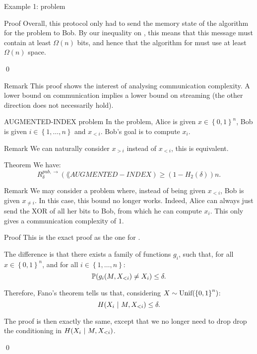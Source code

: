 \documentclass[a4paper]{article}
\begin{document}
\begin{parag}{Example 1:  problem}
\begin{subparag}{Proof}
        Overall, this protocol only had to send the memory state of the algorithm for the  problem to Bob. By our inequality on , this means that this message must contain at least $\Omega\left(n\right)$ bits, and hence that the algorithm for  must use at least $\Omega\left(n\right)$ space.

        \qed
    \end{subparag}

    \begin{subparag}{Remark}
        This proof shows the interest of analysing communication complexity. A lower bound on communication implies a lower bound on streaming (the other direction does not necessarily hold).
    \end{subparag}
\end{parag}

\begin{parag}{AUGMENTED-INDEX problem}
    In the  problem, Alice is given $x \in \left\{0, 1\right\}^n$, Bob is given $i \in \left\{1, \ldots, n\right\}$ and $x_{< i}$. Bob's goal is to compute $x_i$.

    \begin{subparag}{Remark}
        We can naturally consider $x_{> i}$ instead of $x_{< i}$, this is equivalent.
    \end{subparag}
\end{parag}

\begin{parag}{Theorem}
    We have: 
    \[R_{\delta}^{pub, \to}\left(\lang{AUGMENTED-INDEX}\right) \geq \left(1 - H_2\left(\delta\right)\right)n.\]

    \begin{subparag}{Remark}
        We may consider a problem  where, instead of being given $x_{< i}$, Bob is given $x_{\neq i}$. In this case, this bound no longer works. Indeed, Alice can always just send the XOR of all her bits to Bob, from which he can compute $x_i$. This only gives a communication complexity of $1$.
    \end{subparag}

    \begin{subparag}{Proof}
        This is the exact proof as the one for . 

        The difference is that there exists a family of functions $g_i$, such that, for all $x \in \left\{0, 1\right\}^n$, and for all $i \in \left\{1, \ldots, n\right\}$: 
        \[\prob\left(g_i\left(M, X_{<i}\right) \neq X_i\right) \leq \delta.\]

        Therefore, Fano's theorem tells us that, considering $X \followsdistr \text{Unif}\left(\left\{0, 1\right\}^n\right)$: 
        \[H\left(X_i \suchthat M, X_{< i}\right) \leq \delta.\]
        
        The proof is then exactly the same, except that we no longer need to drop drop the conditioning in $H\left(X_i \suchthat M, X_{<i}\right)$.

        \qed
    \end{subparag}
\end{parag}
\end{document}

